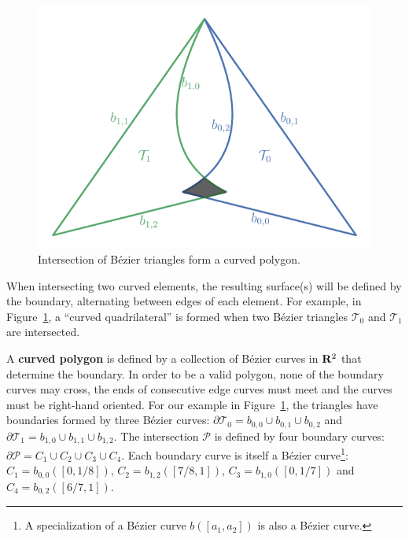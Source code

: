 \begin{figure}
  \includegraphics{../images/preliminaries/main_figure26.pdf}
  \centering
  \captionsetup{width=.75\linewidth}
  \caption{Intersection of B\'{e}zier triangles form a curved polygon.}
  \label{fig:bezier-triangle-intersect}
\end{figure}

When intersecting two curved elements, the resulting surface(s) will
be defined by the boundary, alternating between edges of each
element.
For example, in Figure~\ref{fig:bezier-triangle-intersect}, a
``curved quadrilateral'' is formed when two B\'{e}zier triangles
\(\mathcal{T}_0\) and \(\mathcal{T}_1\) are intersected.

A \textbf{curved polygon} is defined by a collection of B\'{e}zier curves
in \(\mathbf{R}^2\) that determine the boundary. In order to be
a valid polygon, none of the boundary curves may cross, the
ends of consecutive edge curves must meet and the curves must be right-hand
oriented. For our example in
Figure~\ref{fig:bezier-triangle-intersect}, the triangles
have boundaries formed by three B\'{e}zier curves:
\(\partial \mathcal{T}_0 = b_{0, 0} \cup b_{0, 1} \cup b_{0, 2}\) and
\(\partial \mathcal{T}_1 = b_{1, 0} \cup b_{1, 1} \cup b_{1, 2}\).
The intersection \(\mathcal{P}\) is defined by four boundary
curves: \(\partial \mathcal{P} =
C_1 \cup C_2 \cup C_3 \cup C_4\). Each boundary
curve is itself a B\'{e}zier curve\footnote{A specialization of a
B\'{e}zier curve \(b\left(\left[a_1, a_2\right]\right)\)
is also a B\'{e}zier curve.}:
\(C_1 = b_{0, 0}\left(\left[0, 1/8\right]\right)\),
\(C_2 = b_{1, 2}\left(\left[7/8, 1\right]\right)\),
\(C_3 = b_{1, 0}\left(\left[0, 1/7\right]\right)\) and
\(C_4 = b_{0, 2}\left(\left[6/7, 1\right]\right)\).

